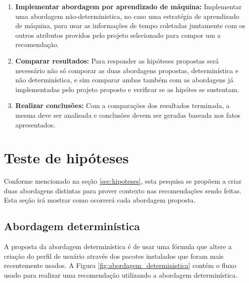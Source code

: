 \begin{enumerate}
    \item \textbf{Implementar abordagem por aprendizado de máquina:}
Implementar uma abordagem não-deterministica, no caso uma estratégia de aprendizado de máquina, para usar as informações de tempo coletadas juntamente com os outros atributos providos pelo projeto selecionado para compor um a recomendação.

    \item \textbf{Comparar resultados:}
Para responder as hipóteses propostas será necessário não só comporar as duas
abordagens propostas, determinística e não determinística, e sim comparar ambas
também com as abordagens já implementadas pelo projeto proposto e verificar se
as hipótes se sustentam.

    \item \textbf{Realizar conclusões:}
Com a comparações dos resultados terminada, a mesma deve ser analisada e conclusões devem ser geradas baseada nos fatos apresentados.
\end{enumerate}



\section{Teste de hipóteses}

Conforme mencionado na seção \ref{sec:hipoteses}, esta pesquisa se propõem a
criar duas abordagens distintas para prover contexto nas recomendações sendo
feitas. Esta seção irá mostrar como ocorrerá cada abordagem proposta.

\subsection{Abordagem determinística}

A proposta da abordagem determinística é de usar uma fórmula que altere
a criação do perfil de usuário através dos pacotes instalados que foram mais
recentemente usados. A Figura \ref{fig:abordagem_deterministica}
contém o fluxo usado para realizar uma
recomendação utilizando a abordagem determinística.

